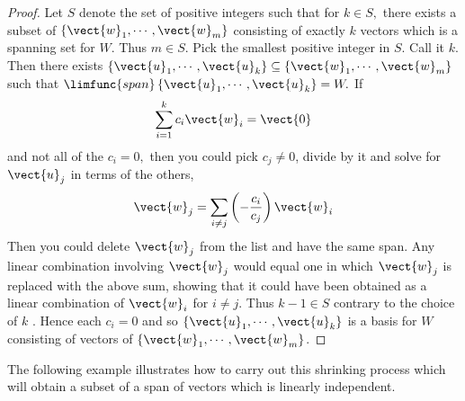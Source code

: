 \begin{proof}
Let $S$ denote the set of positive integers such that for $
k\in S,$ there exists a subset of $\left\{ \vect{w}_{1},\cdots ,\vect{w}_{m}\right\} $ consisting of exactly $k$ vectors
which is a spanning set for $W$. Thus $m\in S$. Pick the smallest positive
integer in $S$. Call it $k$. Then there exists $\left\{ \vect{u}_{1},\cdots ,
\vect{u}_{k}\right\} \subseteq \left\{ \vect{w}_{1},\cdots ,\vect{w}
_{m}\right\} $ such that $\limfunc{span}\left\{ \vect{u}_{1},\cdots ,\vect{u}
_{k}\right\} =W.$ If 
\begin{equation*}
\sum_{i=1}^{k}c_{i}\vect{w}_{i}=\vect{0}
\end{equation*}
and not all of the $c_{i}=0,$ then you could pick $c_{j}\neq 0$, divide by
it and solve for $\vect{u}_{j}$ in terms of the others, 
\begin{equation*}
\vect{w}_{j}=\sum_{i\neq j}\left( -\frac{c_{i}}{c_{j}}\right) \vect{w}_{i}
\end{equation*}
Then you could delete $\vect{w}_{j}$ from the list and have the same span. Any linear combination involving $\vect{w}_{j}$ would equal one in which $\vect{w}_{j}$ is replaced with the
above sum, showing that it could have been obtained as a linear combination
of $\vect{w}_{i}$ for $i\neq j$. Thus $k-1\in S$ contrary to the choice of $k$
. Hence each $c_{i}=0$ and so $\left\{ \vect{u}_{1},\cdots ,\vect{u}
_{k}\right\} $ is a basis for $W$ consisting of vectors of $\left\{ \vect{w}
_{1},\cdots ,\vect{w}_{m}\right\} $.
\end{proof}

The following example illustrates how to carry out this shrinking process which will obtain a subset of a span
of vectors which is linearly independent.


